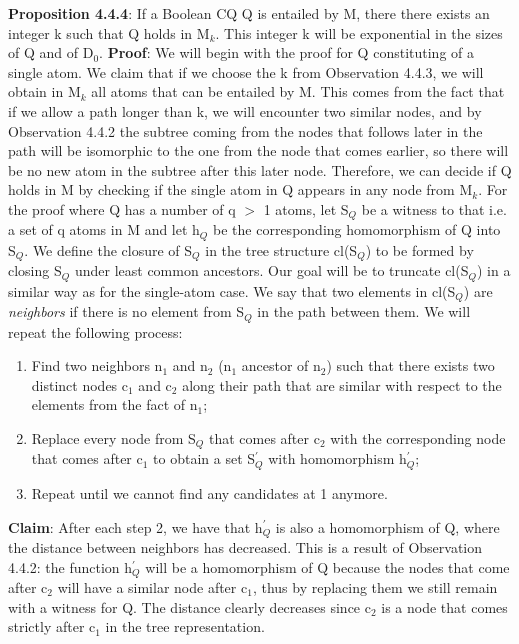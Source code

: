 \documentclass[11pt, a4paper, dvipsnames]{article}
\begin{document}
\textbf{Proposition 4.4.4}: If a Boolean CQ Q is entailed by M, there there exists an integer k such that Q holds in M$_{k}$. This integer k will be exponential in the sizes of Q and of D$_{0}$.\newline
\textbf{Proof}: We will begin with the proof for Q constituting of a single atom. We claim that if we choose the k from Observation 4.4.3, we will obtain in M$_{k}$ all atoms that can be entailed by M. This comes from the fact that if we allow a path longer than k, we will encounter two similar nodes, and by Observation 4.4.2 the subtree coming from the nodes that follows later in the path will be isomorphic to the one from the node that comes earlier, so there will be no new atom in the subtree after this later node. Therefore, we can decide if Q holds in M by checking if the single atom in Q appears in any node from M$_{k}$.\newline
For the proof where Q has a number of q $>$ 1 atoms, let S$_{Q}$ be a witness to that i.e. a set of q atoms in M and let h$_{Q}$ be the corresponding homomorphism of Q into S$_{Q}$. We define the closure of S$_{Q}$ in the tree structure cl(S$_{Q}$) to be formed by closing S$_{Q}$ under least common ancestors. Our goal will be to truncate cl(S$_{Q}$) in a similar way as for the single-atom case. We say that two elements in cl(S$_{Q}$) are \textit{neighbors} if there is no element from S$_{Q}$ in the path between them. We will repeat the following process:
\begin{enumerate}
	\item Find two neighbors n$_{1}$ and n$_{2}$ (n$_{1}$ ancestor of n$_{2}$) such that there exists two distinct nodes c$_{1}$ and c$_{2}$ along their path that are similar with respect to the elements from the fact of n$_{1}$;
	\item Replace every node from S$_{Q}$ that comes after c$_{2}$ with the corresponding node that comes after c$_{1}$ to obtain a set S$^{'}_{Q}$ with homomorphism h$^{'}_{Q}$;
	\item Repeat until we cannot find any candidates at 1 anymore.
\end{enumerate}
\textbf{Claim}: After each step 2, we have that h$^{'}_{Q}$ is also a homomorphism of Q, where the distance between neighbors has decreased.\newline
This is a result of Observation 4.4.2: the function h$^{'}_{Q}$ will be a homomorphism of Q because the nodes that come after c$_{2}$ will have a similar node after c$_{1}$, thus by replacing them we still remain with a witness for Q. The distance clearly decreases since c$_{2}$ is a node that comes strictly after c$_{1}$ in the tree representation.
\end{document}
